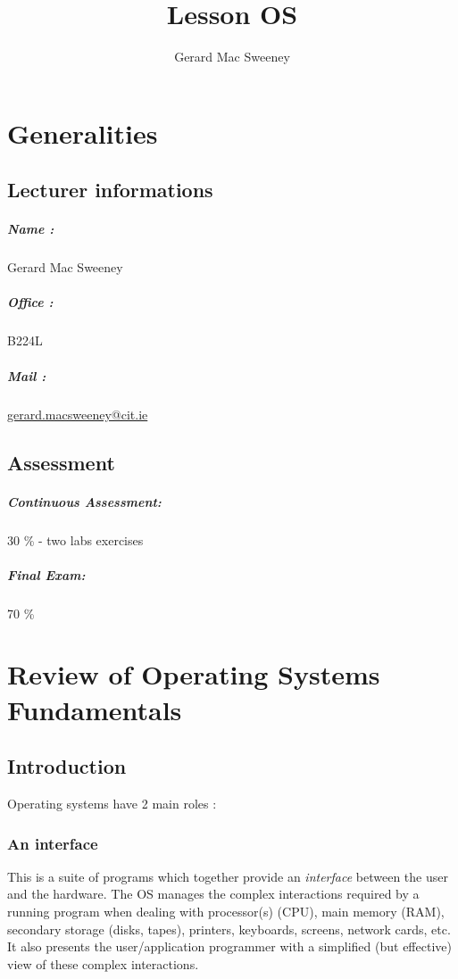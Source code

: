 \documentclass[10pt,a4paper,openany]{book}
\title{Lesson OS}
\author{Gerard Mac Sweeney}
\begin{document}
\maketitle
\tableofcontents

    \chapter{Generalities}
    \section*{Lecturer informations}
    \paragraph*{Name :} Gerard Mac Sweeney
    \paragraph*{Office :} B224L
    \paragraph*{Mail :}
    \href{mailto:gerard.macsweeney@cit.ie}{gerard.macsweeney@cit.ie}

    \section*{Assessment}
    \paragraph*{Continuous Assessment:} 30 \% - two labs exercises
    \paragraph*{Final Exam:} 70 \%

    \chapter{Review of Operating Systems Fundamentals}

    \section{Introduction}
    Operating systems have 2 main roles :

    \subsection*{An interface}
    This is a suite of programs which together provide an \textit{interface} between the user and the hardware. The OS manages the complex interactions required by a running program when dealing with processor(s) (CPU), main memory (RAM), secondary storage (disks, tapes), printers, keyboards, screens, network cards, etc. It also presents the user/application programmer with a simplified (but effective) view of these complex interactions.
\end{document}

